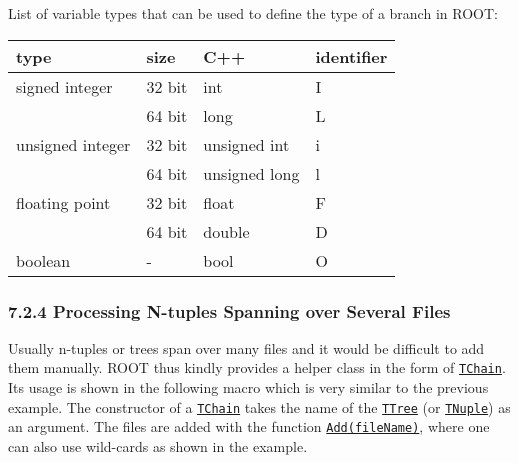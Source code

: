 \documentclass{article}
\begin{document}
List of variable types that can be used to define the type of a branch
in ROOT:

\begin{longtable}[]{@{}llll@{}}
\toprule
type & size & C++ & identifier\tabularnewline
\midrule
\endhead
signed integer & 32 bit & int & I\tabularnewline
& 64 bit & long & L\tabularnewline
unsigned integer & 32 bit & unsigned int & i\tabularnewline
& 64 bit & unsigned long & l\tabularnewline
floating point & 32 bit & float & F\tabularnewline
& 64 bit & double & D\tabularnewline
boolean & - & bool & O\tabularnewline
\bottomrule
\end{longtable}

\subsubsection{7.2.4 Processing N-tuples Spanning over Several
Files}\label{processing-n-tuples-spanning-over-several-files}

Usually n-tuples or trees span over many files and it would be difficult
to add them manually. ROOT thus kindly provides a helper class in the
form of
\href{https://root.cern.ch/doc/master/classTChain.html}{\texttt{TChain}}.
Its usage is shown in the following macro which is very similar to the
previous example. The constructor of a
\href{https://root.cern.ch/doc/master/classTChain.html}{\texttt{TChain}}
takes the name of the
\href{https://root.cern.ch/doc/v606/classTTree.html}{\texttt{TTree}} (or
\href{(https://root.cern.ch/doc/v606/classTNtuple.html)}{\texttt{TNuple}})
as an argument. The files are added with the function
\href{https://root.cern.ch/doc/master/classTH1.html}{\texttt{Add(fileName)}},
where one can also use wild-cards as shown in the example.
\end{document}
